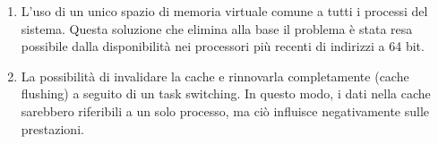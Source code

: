 \begin{enumerate}
    \item L'uso di un unico spazio di memoria virtuale comune a tutti i processi del sistema. Questa soluzione che elimina alla base il problema è stata resa possibile dalla disponibilità nei processori più recenti di indirizzi a 64 bit.
    \item La possibilità di invalidare la cache e rinnovarla completamente (cache flushing) a seguito di un task switching. In questo modo, i dati nella cache sarebbero riferibili a un solo processo, ma ciò influisce negativamente sulle prestazioni.
\end{enumerate}
